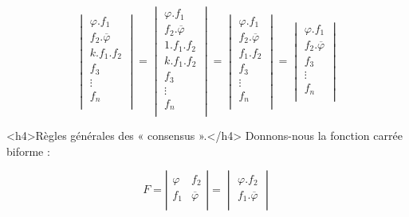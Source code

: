 \[ 
      \begin{vmatrix}
          \varphi . f_1\\ f_2 . \overline{\varphi} \\ k . f_1 . f_2 \\ f_3 \\ \vdots \\ f_n \\
      \end{vmatrix} 
       =   \begin{vmatrix}
                  \varphi . f_1\\ f_2 . \overline{\varphi} \\ 1 . f_1 . f_2 \\  k . f_1 . f_2 \\ f_3 \\ \vdots \\ f_n \\
             \end{vmatrix}
             =   \begin{vmatrix}
                                       \varphi . f_1\\ f_2 . \overline{\varphi} \\  f_1 . f_2 \\  f_3 \\ \vdots \\ f_n \\
                  \end{vmatrix} 
                  =  \begin{vmatrix}
                                       \varphi . f_1\\ f_2 . \overline{\varphi}  \\  f_3 \\ \vdots \\ f_n \\
                    \end{vmatrix} 
\]

<h4>Règles générales des « consensus ».</h4> Donnons-nous la fonction carrée biforme : 

\[
   F =      \left| \begin{array}{c|c} 
                      \varphi  & f_2 \\
                      f_1 & \overline{\varphi} \\
                   \end{array} \right| 
                                   =
                  \begin{vmatrix}  {\varphi} . f_2  \\
                                f_1 .  \overline{ \varphi}   \\
                  \end{vmatrix}
\]


